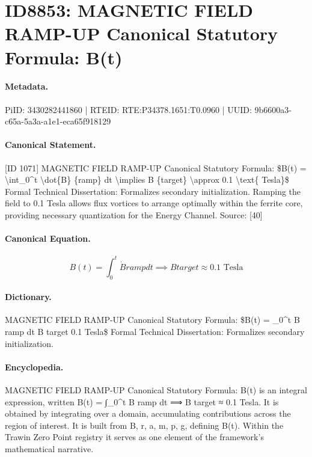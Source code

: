 \section*{ID8853: MAGNETIC FIELD RAMP-UP Canonical Statutory Formula: B(t)}
\paragraph{Metadata.}
PiID: 3430282441860 | RTEID: RTE:P34378.1651:T0.0960 | UUID: 9b6600a3-c65a-5a3a-a1e1-eca65f918129

\paragraph{Canonical Statement.}
[ID 1071] MAGNETIC FIELD RAMP-UP Canonical Statutory Formula: \$B(t) = \textbackslash{}int\_0\textasciicircum{}t \textbackslash{}dot\{B\} \{ramp\} dt \textbackslash{}implies B \{target\} \textbackslash{}approx 0.1 \textbackslash{}text\{ Tesla\}\$ Formal Technical Dissertation: Formalizes secondary initialization. Ramping the field to 0.1 Tesla allows flux vortices to arrange optimally within the ferrite core, providing necessary quantization for the Energy Channel. Source: [40]

\paragraph{Canonical Equation.}
\[
B(t) = \int_0^t \dot{B} {ramp} dt \implies B {target} \approx 0.1 \text{ Tesla}
\]

\paragraph{Dictionary.}
MAGNETIC FIELD RAMP-UP Canonical Statutory Formula: \$B(t) = \_0\textasciicircum{}t B ramp dt B target 0.1 Tesla\$ Formal Technical Dissertation: Formalizes secondary initialization.

\paragraph{Encyclopedia.}
MAGNETIC FIELD RAMP-UP Canonical Statutory Formula: B(t) is an integral expression, written B(t) = ∫\_0\textasciicircum{}t B ramp dt ⟹ B target ≈ 0.1 Tesla. It is obtained by integrating over a domain, accumulating contributions across the region of interest. It is built from B, r, a, m, p, g, defining B(t). Within the Trawin Zero Point registry it serves as one element of the framework's mathematical narrative.
